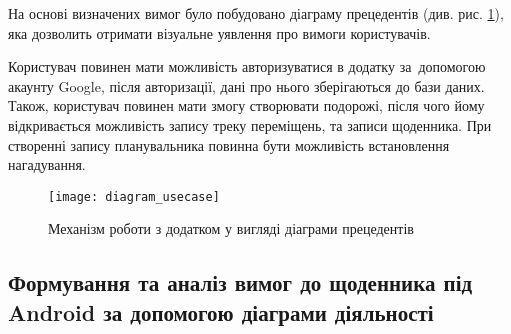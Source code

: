 \documentclass[../main.tex]{subfiles}
\begin{document}
На основі визначених вимог було побудовано діаграму прецедентів (див. рис. \ref{diagram:usecase}), яка дозволить отримати візуальне уявлення про вимоги користувачів.

Користувач повинен мати можливість авторизуватися в додатку за~допомогою акаунту Google, після авторизації, дані про нього зберігаються до бази даних. Також, користувач повинен мати змогу створювати подорожі, після чого йому відкривається можливість запису треку переміщень, та записи щоденника. При створенні запису планувальника повинна бути можливість встановлення нагадування.

\begin{figure}[H]
	\centering
	\texttt{[image: diagram\_usecase]}
	\caption{Механізм роботи з додатком у вигляді діаграми прецедентів} %
	\label{diagram:usecase}
\end{figure}




\subsection{Формування та аналіз вимог до щоденника  під Android за допомогою діаграми діяльності}
\end{document}
